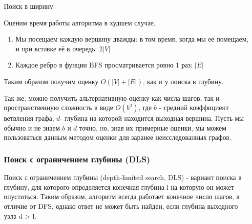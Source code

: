\begin{algorithm}[H]
\SetAlgoLined
{}

\caption{Поиск в ширину} \label{algo:BFS}
\end{algorithm}

Оценим время работы алгоритма в худшем случае.
\begin{enumerate}
    \item Мы посещаем каждую вершину дважды: в том время, когда мы её помещаем, и при вставке её в очередь: $2|V|$
    \item Каждое ребро в фунции BFS просматривается ровно 1 раз: $|E|$
\end{enumerate}

Таким образом получим оценку $O(|V| + |E|)$, как и у поиска в глубину.

Так же, можно получить альтернативную оценку как числа шагов, так и пространственную сложность в виде $O(b^{d})$, где $b$ - средний коэффициент ветвления графа, $d$- глубина на которой находится выходная вершина. Пусть мы обычно и не знаем $b$ и $d$ точно, но, зная их примерные оценки, мы можем пользоваться данным методом оценки для заранее неисследованных графов.

\subsubsection{Поиск с ограничением глубины (DLS)} \label{DLS-algo}

Поиск с ограничением глубины (depth-limited search, DLS) - вариант поиска в глубину, для которого определяется конечная глубина l на которую он может опуститься. Таким образом, алгоритм всегда работает конечное число шагов, в отличие от DFS, однако ответ не может быть найден, если глубина выходного узла d > l.

